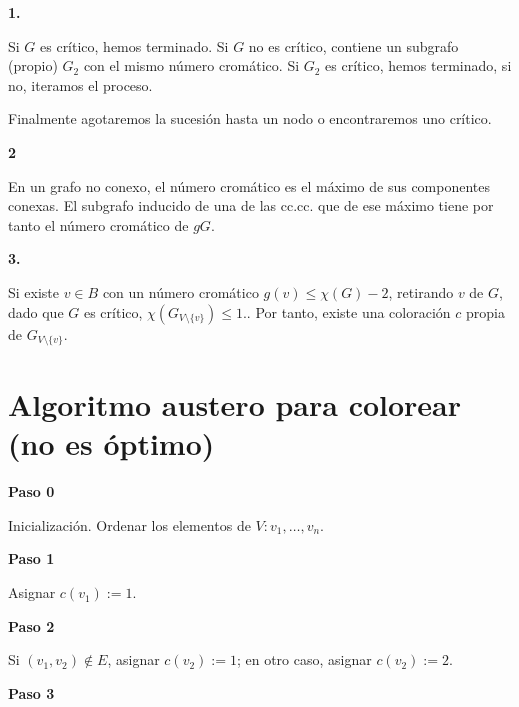 \documentclass[openany]{book}
\begin{document}
\begin{demonstration}
  \begin{center}
  \textbf{1.}
  \end{center}

  Si $G$ es crítico, hemos terminado. Si $G$ no es crítico, contiene un subgrafo (propio) $G_2$ con el mismo número cromático. Si $G_2$ es crítico, hemos terminado, si no, iteramos el proceso.

  Finalmente agotaremos la sucesión hasta un nodo o encontraremos uno crítico.

  \begin{center}
  \textbf{2}
  \end{center}

  En un grafo no conexo, el número cromático es el máximo de sus componentes conexas. El subgrafo inducido de una de las cc.cc. que de ese máximo tiene por tanto el número cromático de $gG$.

  \begin{center}
  \textbf{3.}
  \end{center}

  Si existe $v \in B$ con un número cromático $g(v) \leq \chi(G)-2$, retirando $v$ de $G$, dado que $G$ es crítico, $\chi(G_{V\setminus \{v\}}) \leq 1$.. Por tanto, existe una coloración $c$ propia de $G_{V\setminus \{v\}}$.
\end{demonstration}

\section{Algoritmo austero para colorear (no es óptimo)}

\begin{center}
\textbf{Paso 0}
\end{center}

Inicialización. Ordenar los elementos de $V: v_{1}, \ldots, v_{n}$.

\begin{center}
\textbf{Paso 1}
\end{center}

Asignar $c\left(v_{1}\right):=1$.

\begin{center}
\textbf{Paso 2}
\end{center}

Si $\left(v_{1}, v_{2}\right) \notin E$, asignar $c\left(v_{2}\right):=1$; en otro caso, asignar $c\left(v_{2}\right):=2$.

\begin{center}
\textbf{Paso 3}
\end{center}
\end{document}
